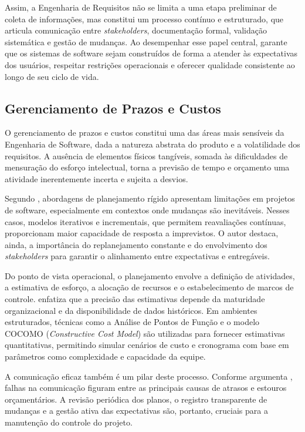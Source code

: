 Assim, a Engenharia de Requisitos não se limita a uma etapa preliminar de coleta de informações, mas constitui um processo contínuo e estruturado, que articula comunicação entre \textit{stakeholders}, documentação formal, validação sistemática e gestão de mudanças. Ao desempenhar esse papel central, garante que os sistemas de software sejam construídos de forma a atender às expectativas dos usuários, respeitar restrições operacionais e oferecer qualidade consistente ao longo de seu ciclo de vida.

\subsection{Gerenciamento de Prazos e Custos}

O gerenciamento de prazos e custos constitui uma das áreas mais sensíveis da Engenharia de Software, dada a natureza abstrata do produto e a volatilidade dos requisitos. A ausência de elementos físicos tangíveis, somada às dificuldades de mensuração do esforço intelectual, torna a previsão de tempo e orçamento uma atividade inerentemente incerta e sujeita a desvios.

Segundo , abordagens de planejamento rígido apresentam limitações em projetos de software, especialmente em contextos onde mudanças são inevitáveis. Nesses casos, modelos iterativos e incrementais, que permitem reavaliações contínuas, proporcionam maior capacidade de resposta a imprevistos. O autor destaca, ainda, a importância do replanejamento constante e do envolvimento dos \textit{stakeholders} para garantir o alinhamento entre expectativas e entregáveis.

Do ponto de vista operacional, o planejamento envolve a definição de atividades, a estimativa de esforço, a alocação de recursos e o estabelecimento de marcos de controle.  enfatiza que a precisão das estimativas depende da maturidade organizacional e da disponibilidade de dados históricos. Em ambientes estruturados, técnicas como a Análise de Pontos de Função e o modelo COCOMO (\textit{Constructive Cost Model}) são utilizadas para fornecer estimativas quantitativas, permitindo simular cenários de custo e cronograma com base em parâmetros como complexidade e capacidade da equipe.

A comunicação eficaz também é um pilar deste processo. Conforme argumenta , falhas na comunicação figuram entre as principais causas de atrasos e estouros orçamentários. A revisão periódica dos planos, o registro transparente de mudanças e a gestão ativa das expectativas são, portanto, cruciais para a manutenção do controle do projeto.

